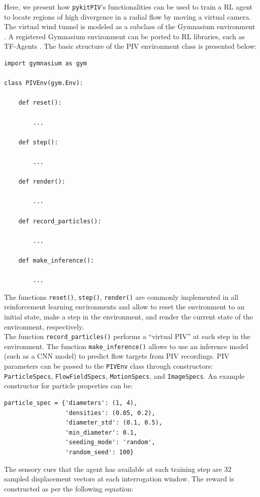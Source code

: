 \documentclass[a4paper,fleqn]{cas-dc}
\begin{document}
Here, we present how \texttt{pykitPIV}'s functionalities can be used to train a RL agent to locate regions of high divergence in a radial flow by moving a virtual camera. The virtual wind tunnel is modeled as a subclass of the Gymnasium environment \cite{brockman2016openai}. A registered Gymnasium environment can be ported to RL libraries, such as TF-Agents \cite{TFAgents}. The basic structure of the PIV environment class is presented below:
\lstset{language=Python}
\begin{lstlisting}
import gymnasium as gym

class PIVEnv(gym.Env):

	def reset():
	
		...
		
	def step():
	
		...
	
	def render():
	
		...
	
	def record_particles():
	
		...
	
	def make_inference():

		...

\end{lstlisting}
The functions \texttt{reset()}, \texttt{step()},  \texttt{render()} are commonly implemented in all reinforcement learning environments and allow to reset the environment to an initial state, make a step in the environment, and render the current state of the environment, respectively. \\
The function \texttt{record\_particles()} performs a ``virtual PIV'' at each step in the environment. The function \texttt{make\_inference()} allows to use an inference model (such as a CNN model) to predict flow targets from PIV recordings. PIV parameters can be passed to the \texttt{PIVEnv} class through constructors: \texttt{ParticleSpecs}, \texttt{FlowFieldSpecs}, \texttt{MotionSpecs}, and \texttt{ImageSpecs}. An example constructor for particle properties can be:
\lstset{language=Python}
\begin{lstlisting}
particle_spec = {'diameters': (1, 4),
                 'densities': (0.05, 0.2),
                 'diameter_std': (0.1, 0.5),
                 'min_diameter': 0.1,
                 'seeding_mode': 'random',
                 'random_seed': 100}
\end{lstlisting}
The sensory cues that the agent has available at each training step are 32 sampled displacement vectors at each interrogation window. The reward is constructed as per the following equation:
\end{document}
